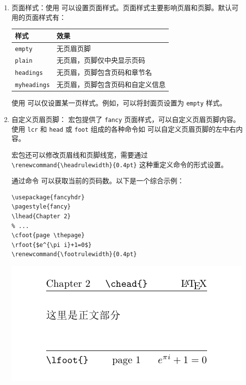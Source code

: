 \begin{enumerate}
\item 页面样式：使用 \boxforcmd{\\pagestyle{}} 可以设置页面样式。页面样式主要影响页眉和页脚。默认可用的页面样式有：

\begin{tcolorbox}[colback=white]
\centering
\begin{tabular}{ll}
    样式 & 效果 \\
\hline
    \verb|empty| & 无页眉页脚 \\
    \verb|plain| & 无页眉，页脚仅中央显示页码 \\
    \verb|headings| & 无页眉，页脚包含页码和章节名 \\
    \verb|myheadings| & 无页眉，页脚包含页码和自定义信息 \\
\end{tabular}
\end{tcolorbox}

使用 \boxforcmd{\\thispagestyle{}} 可以仅设置某一页样式。例如，可以将封面页设置为 \verb|empty| 样式。

\item 自定义页眉页脚： 宏包提供了 \verb|fancy| 页面样式，可以自定义页眉页脚内容。使用 \verb|lcr| 和 \verb|head| 或 \verb|foot| 组成的各种命令如 \boxforcmd{\\rhead{}} 可以自定义页眉页脚的左中右内容。

 宏包还可以修改页眉线和页脚线宽，需要通过 \lstinline|\renewcommand{\headrulewidth}{0.4pt}| 这种重定义命令的形式设置。

通过命令 \boxforcmd{\\thepage} 可以获取当前的页码数。以下是一个综合示例：

\begin{tcolorbox}[sidebyside]
\begin{lstlisting}
\usepackage{fancyhdr}
\pagestyle{fancy}
\lhead{Chapter 2}
% ...
\cfoot{page \thepage}
\rfoot{$e^{\pi i}+1=0$}
\renewcommand{\footrulewidth}{0.4pt}
\end{lstlisting}

\tcblower

\includegraphics{./resource/tikz/hdr.pdf}
\end{tcolorbox}


\end{enumerate}
